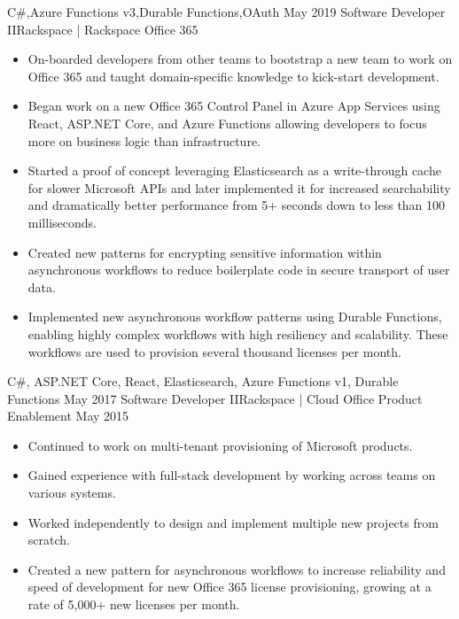 \begin{experiences}
{\begin{itemize}
                      \end{itemize}
                    }
                    {C\#,Azure Functions v3,Durable Functions,OAuth}
  \emptySeparator
  \experience
    {May 2019}     {Software Developer II}{Rackspace | Rackspace Office 365}
    {}
                    {
                      \begin{itemize}
                        \item On-boarded developers from other teams to bootstrap a new team to work on Office 365 and taught domain-specific knowledge to kick-start development.
                        \item Began work on a new Office 365 Control Panel in Azure App Services using React, ASP.NET Core, and Azure Functions allowing developers to focus more on business logic than infrastructure.
                        \item Started a proof of concept leveraging Elasticsearch as a write-through cache for slower Microsoft APIs and later implemented it for increased searchability and dramatically better performance from 5+ seconds down to less than 100 milliseconds.
                        \item Created new patterns for encrypting sensitive information within asynchronous workflows to reduce boilerplate code in secure transport of user data.
                        \item Implemented new asynchronous workflow patterns using Durable Functions, enabling highly complex workflows with high resiliency and scalability. These workflows are used to provision several thousand licenses per month.
                      \end{itemize}
                    }
                    {C\#, ASP.NET Core, React, Elasticsearch, Azure Functions v1, Durable Functions}
\ifcv
  \emptySeparator
  \experience
    {May 2017}     {Software Developer II}{Rackspace | Cloud Office Product Enablement}
    {May 2015}     {
                      \begin{itemize}
                        \item Continued to work on multi-tenant provisioning of Microsoft products.
                        \item Gained experience with full-stack development by working across teams on various systems.
                        \item Worked independently to design and implement multiple new projects from scratch.
                        \item Created a new pattern for asynchronous workflows to increase reliability and speed of development for new Office 365 license provisioning, growing at a rate of 5,000+ new licenses per month.

\end{itemize}}
\end{experiences}
